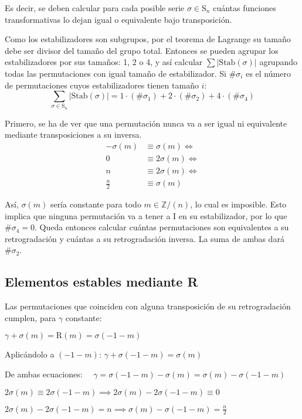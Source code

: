 		Es decir, se deben calcular para cada posible serie $\sigma\in\text{S}_n$ cuántas funciones transformativas lo dejan igual o equivalente bajo transposición.
		
		Como los estabilizadores son subgrupos, por el teorema de Lagrange su tamaño debe ser divisor del tamaño del grupo total. Entonces se pueden agrupar los estabilizadores por sus tamaños: 1, 2 o 4, y así calcular $\sum|\text{Stab}(\sigma)|$ agrupando todas las permutaciones con igual tamaño de estabilizador. Si $\#\sigma_i$ es el número de permutaciones cuyos estabilizadores tienen tamaño $i$:		
		\[\sum_{\sigma\in\text{S}_n}|\text{Stab}(\sigma)|=1\cdot(\#\sigma_1)+2\cdot(\#\sigma_2)+4\cdot(\#\sigma_4)\]
	
		Primero, se ha de ver que una permutación nunca va a ser igual ni equivalente mediante transposiciones a su inversa.	\label{inversano}
			\begin{align*}
			-\sigma(m)&\equiv\sigma(m)\Longleftrightarrow\\
			0&\equiv2\sigma(m)\Longleftrightarrow\\
			n&\equiv2\sigma(m)\Longleftrightarrow\\
			\frac{n}{2}&\equiv\sigma(m)
			\end{align*}
		
		Así, $\sigma(m)$ sería constante para todo $m\in \mathbb{Z} / (n)$, lo cual es imposible. Esto implica que ninguna permutación va a tener a I en su estabilizador, por lo que $\#\sigma_4=0$. Queda entonces calcular cuántas permutaciones son equivalentes a su retrogradación y cuántas a su retrogradación inversa. La suma de ambas dará $\#\sigma_2$.
	
	\subsection{Elementos estables mediante R}
		Las permutaciones que coinciden con alguna transposición de su retrogradación cumplen, para $\gamma$ constante:
		
		\hspace*{8.5\bigskipamount} $\gamma+\sigma(m) = \text{R}(m) = \sigma(-1-m)$
		
		Aplicándolo a $(-1-m)$:
		$\gamma+\sigma(-1-m) = \sigma(m)$
		
		De ambas ecuaciones: $\quad\gamma=\sigma(-1-m)-\sigma(m)=\sigma(m)-\sigma(-1-m)$
		
		$2\sigma(m)\equiv2\sigma(-1-m)\implies2\sigma(m)-2\sigma(-1-m)\equiv0$
		
		$2\sigma(m)-2\sigma(-1-m)=n \implies \sigma(m)-\sigma(-1-m)=\frac{n}{2}$
		
